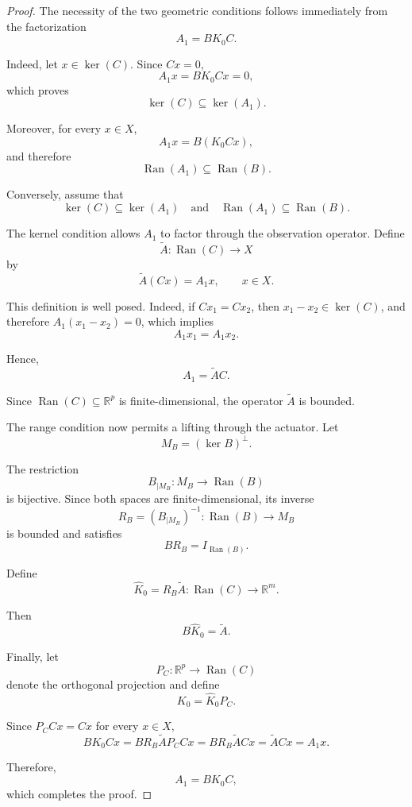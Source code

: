 \documentclass[pdflatex,sn-mathphys-num]{sn-jnl}
\theoremstyle{thmstyleone}%
\theoremstyle{thmstyletwo}%
\theoremstyle{thmstylethree}%
\begin{document}
\begin{proof}

The necessity of the two geometric conditions follows immediately from the factorization
\[
A_{1}=BK_{0}C.
\]

Indeed, let \(x\in\ker(C)\). Since \(Cx=0\),
\[
A_{1}x
=
BK_{0}Cx
=
0,
\]
which proves
\[
\ker(C)\subseteq\ker(A_{1}).
\]

Moreover, for every \(x\in X\),
\[
A_{1}x
=
B(K_{0}Cx),
\]
and therefore
\[
\operatorname{Ran}(A_{1})
\subseteq
\operatorname{Ran}(B).
\]

Conversely, assume that
\[
\ker(C)\subseteq\ker(A_{1})
\quad\text{and}\quad
\operatorname{Ran}(A_{1})
\subseteq
\operatorname{Ran}(B).
\]

The kernel condition allows \(A_{1}\) to factor through the observation operator. Define
\[
\widetilde A:
\operatorname{Ran}(C)
\rightarrow
X
\]
by
\[
\widetilde A(Cx)
=
A_{1}x,
\qquad
x\in X.
\]

This definition is well posed. Indeed, if \(Cx_{1}=Cx_{2}\), then \(x_{1}-x_{2}\in\ker(C)\), and therefore \(A_{1}(x_{1}-x_{2})=0\), which implies
\[
A_{1}x_{1}
=
A_{1}x_{2}.
\]

Hence,
\[
A_{1}
=
\widetilde AC.
\]

Since \(\operatorname{Ran}(C)\subseteq\mathbb R^{p}\) is
finite-dimensional, the operator \(\widetilde A\) is bounded.

The range condition now permits a lifting through the actuator. Let
\[
M_{B}
=
(\ker B)^{\perp}.
\]

The restriction
\[
B_{|M_{B}}
:
M_{B}
\rightarrow
\operatorname{Ran}(B)
\]
is bijective. Since both spaces are finite-dimensional, its inverse
\[
R_{B}
=
(B_{|M_{B}})^{-1}
:
\operatorname{Ran}(B)
\rightarrow
M_{B}
\]
is bounded and satisfies
\[
BR_{B}
=
I_{\operatorname{Ran}(B)}.
\]

Define
\[
\widehat K_{0}
=
R_{B}\widetilde A
:
\operatorname{Ran}(C)
\rightarrow
\mathbb R^{m}.
\]

Then
\[
B\widehat K_{0}
=
\widetilde A.
\]

Finally, let
\[
P_{C}
:
\mathbb R^{p}
\rightarrow
\operatorname{Ran}(C)
\]
denote the orthogonal projection and define
\[
K_{0}
=
\widehat K_{0}P_{C}.
\]

Since \(P_{C}Cx=Cx\) for every \(x\in X\),
\[
BK_{0}Cx
=
BR_{B}\widetilde AP_{C}Cx
=
BR_{B}\widetilde ACx
=
\widetilde ACx
=
A_{1}x.
\]

Therefore,
\[
A_{1}
=
BK_{0}C,
\]
which completes the proof.

\end{proof}
\end{document}
